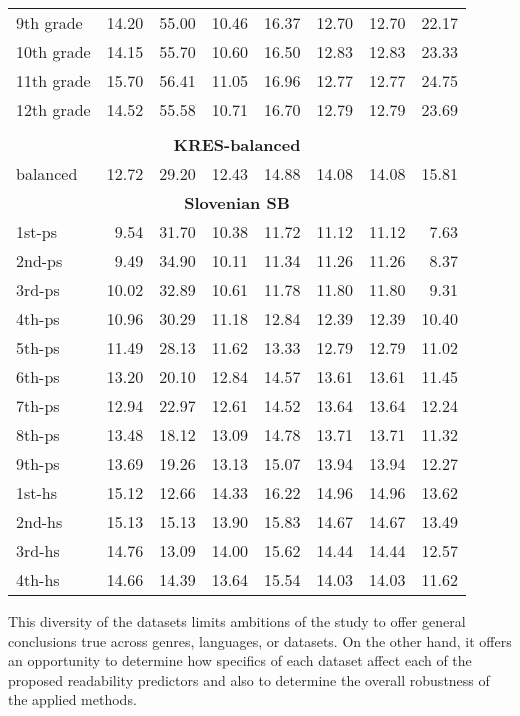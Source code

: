 \documentclass{clv3}
\begin{document}
\begin{table*}[h!!tp]
{\begin{tabular}{lrrrrrrr}
9th grade & 14.20 & 55.00 & 10.46 & 16.37 & 12.70 & 12.70 & 22.17\\
10th grade & 14.15 & 55.70 & 10.60 & 16.50 & 12.83 & 12.83 & 23.33\\
11th grade & 15.70 & 56.41 & 11.05 & 16.96 & 12.77 & 12.77 & 24.75\\
12th grade & 14.52 & 55.58 & 10.71 & 16.70 & 12.79 & 12.79 & 23.69\\
&&&&&&& \\
\multicolumn{8}{c}{\textbf{KRES-balanced}}\\\hline
balanced & 12.72 & 29.20 & 12.43 & 14.88 & 14.08 & 14.08 & 15.81\\
\multicolumn{8}{c}{\textbf{Slovenian SB}}\\\hline
1st-ps & 9.54 & 31.70 & 10.38 & 11.72 & 11.12 & 11.12 & 7.63\\
2nd-ps & 9.49 & 34.90 & 10.11 & 11.34 & 11.26 & 11.26 & 8.37\\
3rd-ps & 10.02 & 32.89 & 10.61 & 11.78 & 11.80 & 11.80 & 9.31\\
4th-ps & 10.96 & 30.29 & 11.18 & 12.84 & 12.39 & 12.39 & 10.40\\
5th-ps & 11.49 & 28.13 & 11.62 & 13.33 & 12.79 & 12.79 & 11.02\\
6th-ps & 13.20 & 20.10 & 12.84 & 14.57 & 13.61 & 13.61 & 11.45\\
7th-ps & 12.94 & 22.97 & 12.61 & 14.52 & 13.64 & 13.64 & 12.24\\
8th-ps & 13.48 & 18.12 & 13.09 & 14.78 & 13.71 & 13.71 & 11.32\\
9th-ps & 13.69 & 19.26 & 13.13 & 15.07 & 13.94 & 13.94 & 12.27\\
1st-hs & 15.12 & 12.66 & 14.33 & 16.22 & 14.96 & 14.96 & 13.62\\
2nd-hs & 15.13 & 15.13 & 13.90 & 15.83 & 14.67 & 14.67 & 13.49\\
3rd-hs & 14.76 & 13.09 & 14.00 & 15.62 & 14.44 & 14.44 & 12.57\\
4th-hs & 14.66 & 14.39 & 13.64 & 15.54 & 14.03 & 14.03 & 11.62\\
\hline 
\end{tabular}
}
\label{table:datasets-stats}
\end{table*}

This diversity of the datasets limits ambitions of the study to offer general conclusions true across genres, languages, or datasets. On the other hand, it offers an opportunity to determine how specifics of each dataset affect each of the proposed readability predictors and also to determine the overall robustness of the applied methods. 
\end{document}
